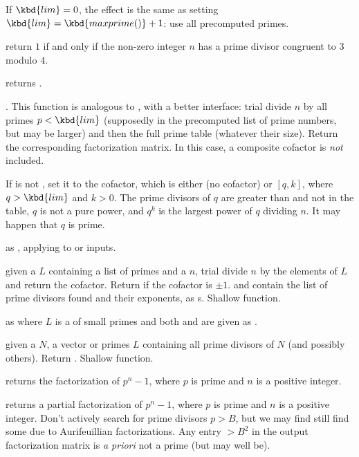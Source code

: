 If $\kbd{lim} = 0$, the effect is the same as setting $\kbd{lim} =
\kbd{maxprime()} + 1$: use all precomputed primes.

 return $1$ if and only if the non-zero
integer $n$ has a prime divisor congruent to $3$ modulo $4$.

 returns
.

. This function
is analogous to
, with a better interface: trial divide $n$ by all
primes $p < \kbd{lim}$ (supposedly in the precomputed list of prime numbers,
but  may be larger) and then the full  prime table
(whatever their size).
Return the corresponding factorization matrix. In this case, a composite
cofactor is \emph{not} included.

If  is not , set it to the cofactor, which is either
 (no cofactor) or $[q,k]$, where $q > \kbd{lim}$ and $k > 0$.
The prime divisors of $q$ are greater than  and not in the
 table, $q$ is not a pure power, and $q^k$ is the largest
power of $q$ dividing $n$. It may happen that $q$ is prime.

 as , applying to
 or  inputs.

 given a 
$L$ containing a list of primes and a  $n$, trial divide
$n$ by the elements of $L$ and return the cofactor. Return  if the
cofactor is $\pm 1$.  and  contain the list of prime divisors
found and their exponents, as s. Shallow function.

 as
 where $L$ is a  of small primes and both
 and  are given as .

 given a  $N$, a vector or
primes $L$ containing all prime divisors of $N$ (and possibly others). Return
. Shallow function.

 returns the factorization of $p^n-1$,
where $p$ is prime and $n$ is a positive integer.

 returns a partial
factorization of $p^n-1$, where $p$ is prime and $n$ is a positive integer.
Don't actively search for prime divisors $p > B$, but we may find still find
some due to Aurifeuillian factorizations. Any entry $> B^2$ in the output
factorization matrix is \emph{a priori} not a prime (but may well be).

